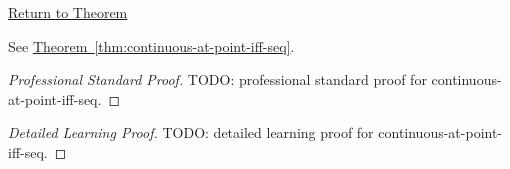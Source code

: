 \newpage
{}
\label{prf:continuous-at-point-iff-seq}

\begin{remark*}[Return]
\hyperref[thm:continuous-at-point-iff-seq]{Return to Theorem}
\end{remark*}

\begin{theorem*}
See \hyperref[thm:continuous-at-point-iff-seq]{Theorem~\ref*{thm:continuous-at-point-iff-seq}}.
\end{theorem*}

\begin{proof}[Professional Standard Proof]
\LRAProofBodyStart
TODO: professional standard proof for continuous-at-point-iff-seq.
\end{proof}

\begin{proof}[Detailed Learning Proof]
\LRAProofBodyStart
TODO: detailed learning proof for continuous-at-point-iff-seq.
\end{proof}

\begin{remark*}
\end{remark*}

\begin{dependencies}
\NoLocalDependencies
\end{dependencies}

\clearpage
